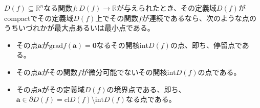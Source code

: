 \documentclass[dvipdfmx]{jsarticle}
\begin{document}
\begin{thm}\label{4.4.3.2}
$D(f) \subseteq \mathbb{R}^{n}$なる関数$f:D(f) \rightarrow \mathbb{R}$が与えられたとき、その定義域$D(f)$がcompactでその定義域$D(f)$上でその関数$f$が連続であるなら、次のような点のうちいづれかが最大点あるいは最小点である。
\begin{itemize}
\item
  その点$\mathbf{a}$が$\mathrm{grad}f\left( \mathbf{a} \right) = \mathbf{0}$なるその開核$\mathrm{int}{D(f)}$の点、即ち、停留点である。
\item
  その点$\mathbf{a}$がその関数$f$が微分可能でないその開核$\mathrm{int}{D(f)}$の点である。
\item
  その点$\mathbf{a}$がその定義域$D(f)$の境界点である、即ち、$\mathbf{a} \in \partial D(f) = \mathrm{cl}{D(f)} \setminus \mathrm{int}{D(f)}$なる点である。
\end{itemize}
\end{thm}
\end{document}
